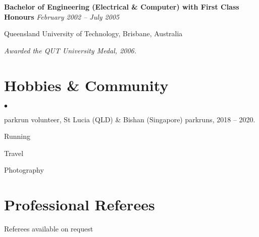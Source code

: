 \documentclass[margin,line]{resume}
\newenvironment{list1}{
  \begin{list}{}{%
      \setlength{\itemsep}{0in}
      \setlength{\parsep}{0in} \setlength{\parskip}{0in}
      \setlength{\topsep}{0in} \setlength{\partopsep}{0in}
      \setlength{\leftmargin}{0.17in}}}{\end{list}}
\newenvironment{list2}{
  \begin{list}{$\bullet$}{%
      \setlength{\itemsep}{0in}
      \setlength{\parsep}{0in} \setlength{\parskip}{0in}
      \setlength{\topsep}{0in} \setlength{\partopsep}{0in}
      \setlength{\leftmargin}{0.2in}}}{\end{list}}
\begin{document}
\begin{resume}
{\bf Bachelor of Engineering (Electrical \& Computer) with First Class Honours} \hfill {\it February 2002 -- July 2005} \\\vspace{-0.85\baselineskip}
\begin{list1}
\item[] Queensland University of Technology, Brisbane, Australia
\item {\it Awarded the QUT University Medal, 2006.}
\end{list1}

\section{\sc Hobbies \& Community}
\begin{list2}
\item parkrun volunteer, St Lucia (QLD) \& Bishan (Singapore) parkruns, 2018 -- 2020.
\item Running
\item Travel
\item Photography
\end{list2}

\section{\sc Professional Referees}
Referees available on request


\end{resume}
\end{document}
